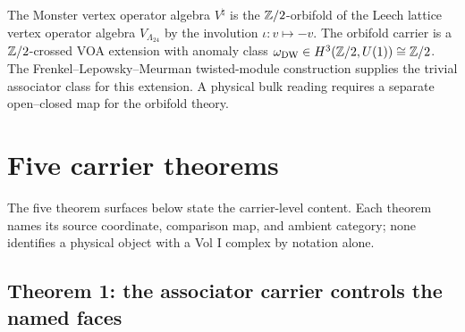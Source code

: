 The Monster vertex operator algebra $V^\natural$
\cite{Frenkel-Lepowsky-Meurman} is the $\mathbb{Z}/2$-orbifold of the Leech
lattice vertex operator algebra $V_{\Lambda_{24}}$ by the involution
$\iota: v \mapsto -v$. The orbifold carrier is a
$\mathbb{Z}/2$-crossed VOA extension with anomaly class
$\omega_{\mathrm{DW}}\in H^3(\mathbb{Z}/2,U(1))\cong\mathbb{Z}/2$. The
Frenkel--Lepowsky--Meurman twisted-module construction supplies the
trivial associator class for this extension. A physical bulk reading
requires a separate open--closed map for the orbifold theory.

\section{Five carrier theorems}
\label{sec:part-iv-five-theorems}

The five theorem surfaces below state the carrier-level content.  Each
theorem names its source coordinate, comparison map, and ambient
category; none identifies a physical object with a Vol I complex by
notation alone.

\subsection{Theorem 1: the associator carrier controls the named faces}
\label{sec:part-iv-thm-1}

